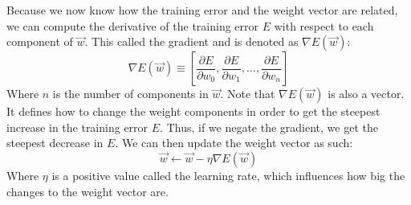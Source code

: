 Because we now know how the training error and the weight vector are related, we can compute the derivative of the training error $E$ with respect to each component of $\overrightarrow{w}$. This called the gradient and is denoted as $\nabla E(\overrightarrow{w})$:
\begin{equation}
    \nabla E(\overrightarrow{w}) \equiv \left [ \frac{\partial E}{\partial w_0}, \frac{\partial E}{\partial w_1}, \dots, \frac{\partial E}{\partial w_n} \right ]
\end{equation}
Where $n$ is the number of components in $\overrightarrow{w}$. Note that $\nabla E(\overrightarrow{w})$ is also a vector. It defines how to change the weight components in order to get the steepest increase in the training error $E$. Thus, if we negate the gradient, we get the steepest decrease in $E$. We can then update the weight vector as such:
\begin{equation}
    \overrightarrow{w} \gets \overrightarrow{w} - \eta \nabla E(\overrightarrow{w})
\end{equation}
Where $\eta$ is a positive value called the learning rate, which influences how big the changes to the weight vector are.\\

